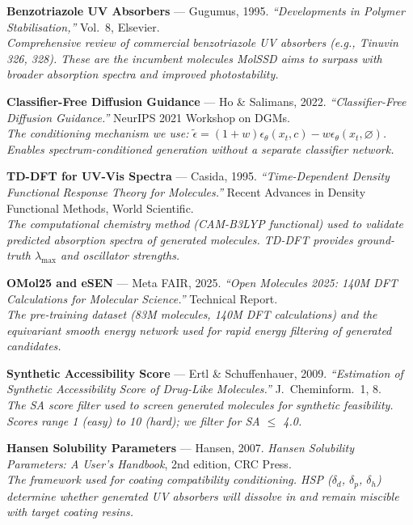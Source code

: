 \documentclass[12pt,a4paper]{article}
\begin{document}
\begin{enumerate}[leftmargin=*, label={[\arabic*]}]

\item \textbf{Benzotriazole UV Absorbers} --- Gugumus, 1995.
\textit{``Developments in Polymer Stabilisation,''} Vol.\ 8, Elsevier.\\
\emph{Comprehensive review of commercial benzotriazole UV absorbers (e.g., Tinuvin 326, 328). These are the incumbent molecules MolSSD aims to surpass with broader absorption spectra and improved photostability.}

\item \textbf{Classifier-Free Diffusion Guidance} --- Ho \& Salimans, 2022.
\textit{``Classifier-Free Diffusion Guidance.''}
NeurIPS 2021 Workshop on DGMs.\\
\emph{The conditioning mechanism we use: $\tilde{\epsilon} = (1+w)\epsilon_\theta(x_t, c) - w\epsilon_\theta(x_t, \varnothing)$. Enables spectrum-conditioned generation without a separate classifier network.}

\item \textbf{TD-DFT for UV-Vis Spectra} --- Casida, 1995.
\textit{``Time-Dependent Density Functional Response Theory for Molecules.''}
Recent Advances in Density Functional Methods, World Scientific.\\
\emph{The computational chemistry method (CAM-B3LYP functional) used to validate predicted absorption spectra of generated molecules. TD-DFT provides ground-truth $\lambda_{\max}$ and oscillator strengths.}

\item \textbf{OMol25 and eSEN} --- Meta FAIR, 2025.
\textit{``Open Molecules 2025: 140M DFT Calculations for Molecular Science.''}
Technical Report.\\
\emph{The pre-training dataset (83M molecules, 140M DFT calculations) and the equivariant smooth energy network used for rapid energy filtering of generated candidates.}

\item \textbf{Synthetic Accessibility Score} --- Ertl \& Schuffenhauer, 2009.
\textit{``Estimation of Synthetic Accessibility Score of Drug-Like Molecules.''}
J.\ Cheminform.\ 1, 8.\\
\emph{The SA score filter used to screen generated molecules for synthetic feasibility. Scores range 1 (easy) to 10 (hard); we filter for SA $\leq$ 4.0.}

\item \textbf{Hansen Solubility Parameters} --- Hansen, 2007.
\textit{Hansen Solubility Parameters: A User's Handbook}, 2nd edition, CRC Press.\\
\emph{The framework used for coating compatibility conditioning. HSP ($\delta_d$, $\delta_p$, $\delta_h$) determine whether generated UV absorbers will dissolve in and remain miscible with target coating resins.}


\end{enumerate}
\end{document}
